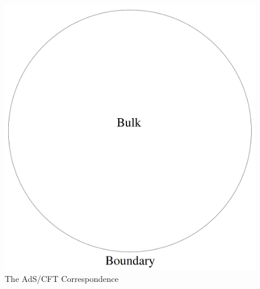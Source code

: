 \documentclass[10pt,aspectratio=169]{beamer}
\begin{document}
\begin{frame}
\begin{minipage}[t]{0.48\linewidth}
\begin{figure}
\begin{center}
        \includegraphics[scale=0.06]{adscft}    
    
    \end{center}
    \caption{The AdS/CFT Correspondence}
    \label{fig:WDW}
\end{figure}

\end{minipage}

\end{frame}
\end{document}
